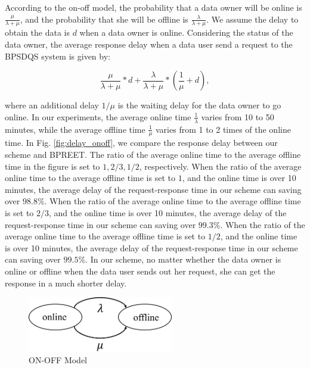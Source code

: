 \documentclass[journal,10pt]{IEEEtran}
\begin{document}
According to the on-off model, the probability that a data owner will be online is $\frac{\mu}{\lambda+\mu}$, and the probability that she will be offline is $\frac{\lambda}{\lambda+\mu}$. We assume the delay to obtain the data is $d$ when a data owner is online. Considering the status of the data owner, the average response delay when a data user send a request to the BPSDQS system is given by:

\begin{equation}
    \frac{\mu}{\lambda+\mu}*d + \frac{\lambda}{\lambda+\mu}*(\frac{1}{\mu}+d),
\end{equation}

where an additional delay $1/\mu$ is the waiting delay for the data owner to go online. In our experiments, 
the average online time $\frac{1}{\lambda}$ varies from 10 to 50 minutes, while the average offline time $\frac{1}{\mu}$ varies from 1 to 2 times of the online time. In Fig. \ref{fig:delay_onoff}, we compare the response delay between our scheme and BPREET. The ratio of the average online time to the average offline time in the figure is set to $1, 2/3, 1/2$, respectively. When the ratio of the average online time to the average offline time is set to $1$, and the online time is over 10 minutes, the average delay of the request-response time in our scheme can saving over $98.8\%$. When the ratio of the average online time to the average offline time is set to $2/3$, and the online time is over 10 minutes, the average delay of the request-response time in our scheme can saving over $99.3\%$. When the ratio of the average online time to the average offline time is set to $1/2$, and the online time is over 10 minutes, the average delay of the request-response time in our scheme can saving over $99.5\%$. In our scheme, no matter whether the data owner is online or offline when the data user sends out her request, she can get the response in a much shorter delay.

\begin{figure}[h]
    \centering
    \includegraphics[width=180pt]{picture/onoff3.png}
    \caption{ON-OFF Model}
    \label{fig:onoff}
\end{figure}
\end{document}
